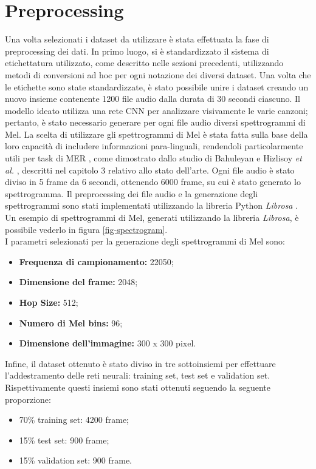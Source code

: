 \documentclass[11pt]{report}
\begin{document}
\newpage

\section{Preprocessing}

Una volta selezionati i dataset da utilizzare è stata effettuata la fase di preprocessing dei dati. In primo luogo, si è standardizzato il sistema di etichettatura utilizzato, come descritto nelle sezioni precedenti, utilizzando metodi di conversioni ad hoc per ogni notazione dei diversi dataset. Una volta che le etichette sono state standardizzate, è stato possibile unire i dataset creando un nuovo insieme contenente 1200 file audio dalla durata di 30 secondi ciascuno. Il modello ideato utilizza una rete CNN per analizzare visivamente le varie canzoni; pertanto, è stato necessario generare per ogni file audio diversi spettrogrammi di Mel. La scelta di utilizzare gli spettrogrammi di Mel è stata fatta sulla base della loro capacità di includere informazioni para-linguali, rendendoli particolarmente utili per task di MER \cite{ma2018emotion}, come dimostrato dallo studio di Bahuleyan \cite{bahuleyan2018music} e Hizlisoy \textit{et al.} \cite{hizlisoy2021music}, descritti nel capitolo 3 relativo allo stato dell'arte. Ogni file audio è stato diviso in 5 frame da 6 secondi, ottenendo 6000 frame, su cui è stato generato lo spettrogramma. Il preprocessing dei file audio e la generazione degli spettrogrammi sono stati implementati utilizzando la libreria Python \textit{Librosa} \cite{mcfee2015librosa}. Un esempio di spettrogrammi di Mel, generati utilizzando la libreria \textit{Librosa}, è possibile vederlo in figura \ref{fig-spectrogram}.\\


I parametri selezionati per la generazione degli spettrogrammi di Mel sono:
\begin{itemize}
    \item \textbf{Frequenza di campionamento:} 22050;
    \item \textbf{Dimensione del frame:} 2048;
    \item \textbf{Hop Size:} 512;
    \item \textbf{Numero di Mel bins:} 96;
    \item \textbf{Dimensione dell'immagine:} 300 x 300 pixel.
\end{itemize}

Infine, il dataset ottenuto è stato diviso in tre sottoinsiemi per effettuare l'addestramento delle reti neurali: training set, test set e validation set. Rispettivamente questi insiemi sono stati ottenuti seguendo la seguente proporzione:
\begin{itemize}
    \item 70\% training set: 4200 frame;
    \item 15\% test set: 900 frame;
    \item 15\% validation set: 900 frame.
\end{itemize}
\end{document}
